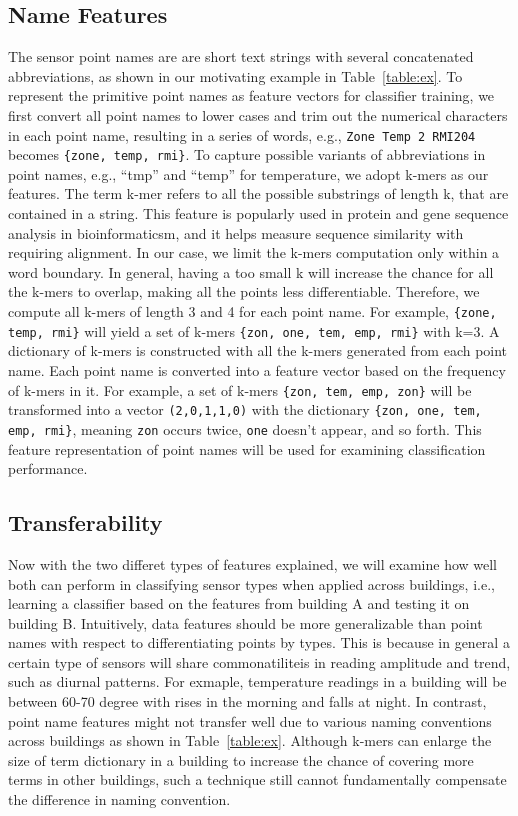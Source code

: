 \subsection{Name Features}
The sensor point names are are short text strings with several concatenated abbreviations, as shown in our motivating example in Table~\ref{table:ex}. 
To represent the primitive point names as feature vectors for classifier training, we first convert all point names to lower cases and trim out the numerical characters in each point name, resulting in a series of words, e.g., \texttt{Zone Temp 2 RMI204} becomes \texttt{\{zone, temp, rmi\}}. 
To capture possible variants of abbreviations in point names, e.g., ``tmp'' and ``temp'' for temperature, we adopt k-mers \cite{leslie2004mismatch} as our features. 
The term k-mer refers to all the possible substrings of length k, that are contained in a string. This feature is popularly used in protein and gene sequence analysis in bioinformaticsm, and it helps measure sequence similarity with requiring alignment. 
In our case, we limit the k-mers computation only within a word boundary.
In general, having a too small k will increase the chance for all the k-mers to overlap, making all the points less differentiable.
Therefore, we compute all k-mers of length 3 and 4 for each point name.
For example, \texttt{\{zone, temp, rmi\}} will yield a set of k-mers \texttt{\{zon, one, tem, emp, rmi\}} with k=3.
A dictionary of k-mers is constructed with all the k-mers generated from each point name. 
Each point name is converted into a feature vector based on the frequency of k-mers in it. 
For example, a set of k-mers \texttt{\{zon, tem, emp, zon\}} will be transformed into a vector
\texttt{(2,0,1,1,0)} with the dictionary \texttt{\{zon, one, tem, emp, rmi\}}, meaning \texttt{zon} occurs twice, \texttt{one} doesn't appear, and so forth. 
This feature representation of point names will be used for examining classification performance.

\subsection{Transferability}
Now with the two differet types of features explained, we will examine how well both can perform in classifying sensor types when applied across buildings, i.e., learning a classifier based on the features from building A and testing it on building B. 
Intuitively, data features should be more generalizable than point names with respect to differentiating points by types. 
This is because in general a certain type of sensors will share commonatiliteis in reading amplitude and trend, such as diurnal patterns. 
For exmaple, temperature readings in a building will be between 60-70 degree with rises in the morning and falls at night.
In contrast, point name features might not transfer well due to various naming conventions across buildings as shown in Table~\ref{table:ex}.
Although k-mers can enlarge the size of term dictionary in a building to increase the chance of covering more terms in other buildings, such a technique still cannot fundamentally compensate the difference in naming convention.

